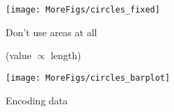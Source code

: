 \documentclass[12pt]{article}\usepackage[]{graphicx}\usepackage[]{color}
\makeatletter
\def\maxwidth{ %
  \ifdim\Gin@nat@width>\linewidth
    \linewidth
  \else
    \Gin@nat@width
  \fi
}
\newenvironment{knitrout}{}{} %
\newcommand{\headsize}{\fontsize{35}{35} \selectfont}
\newcommand{\smallsize}{\fontsize{25}{30} \selectfont}
\makeatother
\begin{document}
\vfill

\begin{knitrout}
\color{fgcolor}

{\centering \texttt{[image: MoreFigs/circles\_fixed]} 

}



\end{knitrout}



\newpage


\headsize \color{myyellow}
\hfill
\begin{minipage}{6.25in}
\centering
Don't use areas at all

\color{myblue} \smallsize
(value $\propto$ length)
\end{minipage}

\vfill

\begin{knitrout}
\color{fgcolor}

{\centering \texttt{[image: MoreFigs/circles\_barplot]} 

}



\end{knitrout}




\newpage


\headsize \color{myyellow}
\hfill
\begin{minipage}{5.75in}
\centering
Encoding data
\end{minipage}

\vspace{30mm}
\end{document}
